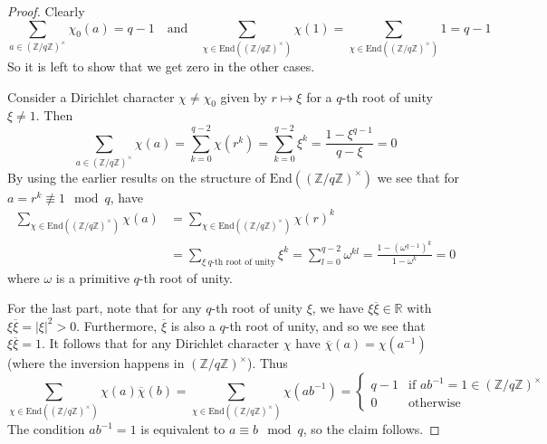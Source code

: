 \documentclass{scrartcl}
\newcommand{\R}{\mathbb{R}}
\newcommand{\Z}{\mathbb{Z}}
\newcommand{\units}{\times}
\theoremstyle{definition}
\begin{document}
\begin{proof}
    Clearly
    \begin{equation*}
        \sum_{a \in (\Z/q\Z)^\units} \chi_0(a) = q - 1 \quad \text{and} \quad \sum_{\chi \in \mathrm{End}((\Z/q\Z)^\units)} \chi(1) = \sum_{\chi \in \mathrm{End}((\Z/q\Z)^\units)} 1 = q - 1
    \end{equation*}
    So it is left to show that we get zero in the other cases.
    
    Consider a Dirichlet character $\chi \neq \chi_0$ given by $r \mapsto \xi$ for a $q$-th root of unity $\xi \neq 1$.
    Then
    \begin{equation*}
        \sum_{a \in (\Z/q\Z)^\units} \chi(a) = \sum_{k = 0}^{q - 2} \chi(r^k) = \sum_{k = 0}^{q - 2} \xi^k = \frac {1 - \xi^{q - 1}} {q - \xi} = 0 
    \end{equation*}
    By using the earlier results on the structure of $\mathrm{End}((\Z/q\Z)^\units)$ we see that for $a = r^k \not\equiv 1 \mod q$, have
    \begin{align*}
        \sum_{\chi \in \mathrm{End}((\Z/q\Z)^\units)} \chi(a) &= \sum_{\chi \in \mathrm{End}((\Z/q\Z)^\units)} \chi(r)^k \\
        &= \sum_{\xi \ \text{$q$-th root of unity}} \xi^k = \sum_{l = 0}^{q - 2} \omega^{kl} = \frac {1 - (\omega^{q - 1})^k} {1 - \omega^k} = 0 
    \end{align*}
    where $\omega$ is a primitive $q$-th root of unity.
    
    For the last part, note that for any $q$-th root of unity $\xi$, we have $\xi\overline{\xi} \in \R$ with $\xi\overline{\xi} = |\xi|^2 > 0$.
    Furthermore, $\overline{\xi}$ is also a $q$-th root of unity, and so we see that $\xi\overline{\xi} = 1$.
    It follows that for any Dirichlet character $\chi$ have $\overline{\chi}(a) = \chi(a^{-1})$ (where the inversion happens in $(\Z/q\Z)^\units$).
    Thus
    \begin{equation*}
        \sum_{\chi \in \mathrm{End}((\Z/q\Z)^\units)} \chi(a)\overline{\chi}(b) = \sum_{\chi \in \mathrm{End}((\Z/q\Z)^\units)} \chi(ab^{-1}) = \begin{cases}
            q - 1 & \text{if $ab^{-1} = 1 \in (\Z/q\Z)^\units$} \\
            0 & \text{otherwise}
        \end{cases}
    \end{equation*}
    The condition $ab^{-1} = 1$ is equivalent to $a \equiv b \mod q$, so the claim follows.
\end{proof}

\printbibliography
\end{document}
